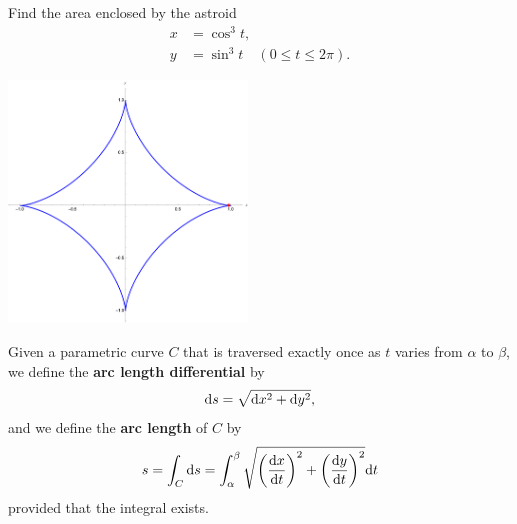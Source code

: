 \begin{example}
Find the area enclosed by the astroid
\begin{align*}
x &= \cos^3 t,\\
y &= \sin^3 t\quad (0\le t\le 2\pi).
\end{align*}
\begin{flushright}
\includegraphics[width=2.5in]{img/astroid}
\end{flushright}
\end{example}
\ifdefined\SOLUTION
{}
\else
\newpage
\fi

\begin{definition}
Given a parametric curve $C$ that is traversed exactly once as $t$ varies from $\alpha$ to $\beta$, we define the \textbf{arc length differential} by
\begin{equation*}
\mathrm{d} s = \sqrt{\mathrm{d} x^2 + \mathrm{d} y^2},
\end{equation*}
and we define the \textbf{arc length} of $C$ by
\begin{equation*}
s = \int_C\mathrm{d} s = \int_\alpha^\beta\sqrt{\left(\frac{\mathrm{d} x}{\mathrm{d} t}\right)^2 + \left(\frac{\mathrm{d} y}{\mathrm{d} t}\right)^2}\mathrm{d} t
\end{equation*}
provided that the integral exists.
\end{definition}

